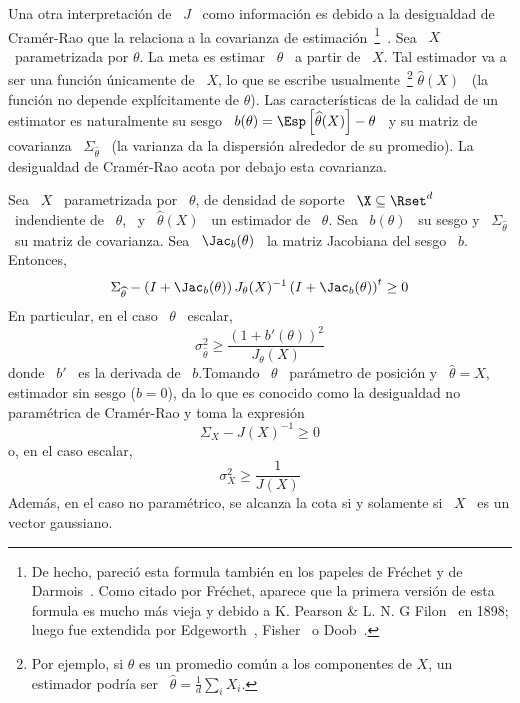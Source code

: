 Una  otra  interpretaci\'on  de \  $J$  \  como  informaci\'on  es debido  a  la
desigualdad   de   Cram\'er-Rao   que   la   relaciona  a   la   covarianza   de
estimaci\'on~\footnote{De hecho, pareci\'o esta formula tambi\'en en los papeles
  de  Fr\'echet y  de Darmois~\cite{Fre43,  Dar45}. Como  citado  por Fr\'echet,
  aparece que la primera versi\'on de esta formula es mucho m\'as vieja y debido
  a K.  Pearson  \& L. N.  G Filon~\cite{PeaFil98} en  1898; luego fue extendida
  por          Edgeworth~\cite{Edg08},          Fisher~\cite{Fis25:07}         o
  Doob~\cite{Doo36}.}~\cite{Rao45,  Rao92,  RaoWis47,  Cra46,  Rio07,  CovTho06,
  Fri04, Kay93,  Bos07}.  Sea \  $X$ \ parametrizada  por $\theta$.  La  meta es
estimar \ $\theta$  \ a partir de \  $X$.  Tal estimador va a  ser una funci\'on
\'unicamente de  \ $X$, lo  que se escribe usualmente~\footnote{Por  ejemplo, si
  $\theta$  es  un promedio  com\'un  a los  componentes  de  $X$, un  estimador
  podr\'ia    ser    \     $\widehat{\theta}    =    \frac1d    \sum_i    X_i$.}
$\widehat{\theta}(X)$ \ (la funci\'on  no depende expl\'icitamente de $\theta$).
Las caracter\'isticas de  la calidad de un estimator es  naturalmente su sesgo \
$b(\theta) = \Esp\left[  \widehat{\theta}(X) \right] - \theta$ \  y su matriz de
covarianza  \  $\Sigma_{\widehat{\theta}}$ \  (la  varianza  da la  dispersi\'on
alrededor de su promedio).  La desigualdad de Cram\'er-Rao acota por debajo esta
covarianza.
%
\begin{teorema}
  Sea  \ $X$  \  parametrizada por  \ $\theta$,  de  densidad de  soporte \  $\X
  \subseteq \Rset^d$ \ indendiente de  \ $\theta$, \ y \ $\widehat{\theta}(X)$ \
  un  estimador   de  \   $\theta$.   Sea   \  $b(\theta)$  \   su  sesgo   y  \
  $\Sigma_{\widehat{\theta}}$ \ su matriz de covarianza.  Sea \ $\Jac_b(\theta)$
  \ la matriz Jacobiana del sesgo \ $b$.  Entonces,
  \[
  \Sigma_{\widehat{\theta}} - \left( I + \Jac_b(\theta) \right) J_\theta(X)^{-1}
  \left( I + \Jac_b(\theta) \right)^t \ge 0
  \]
  En particular, en el  caso \ $\theta$ \ escalar,
  \[
  \sigma_{\widehat{\theta}}^2 \ge \frac{(1+b'(\theta))^2}{J_\theta(X)}
  \]
  donde  \  $b'$ \  es  la  derivada de  \  $b$.\newline  Tomando  \ $\theta$  \
  par\'ametro de posici\'on y \  $\widehat{\theta} = X$, estimador sin sesgo ($b
  =  0$),  da  lo que  es  conocido  como  la  desigualdad no  param\'etrica  de
  Cram\'er-Rao y toma la expresi\'on
  \[
  \Sigma_X - J(X)^{-1} \ge 0
  \]
  o, en el caso escalar,
  \[
  \sigma_X^2 \ge \frac{1}{J(X)}
  \]
  Adem\'as, en el caso no param\'etrico, se  alcanza la cota si y solamente si \
  $X$ \ es un vector gaussiano.
\end{teorema}
